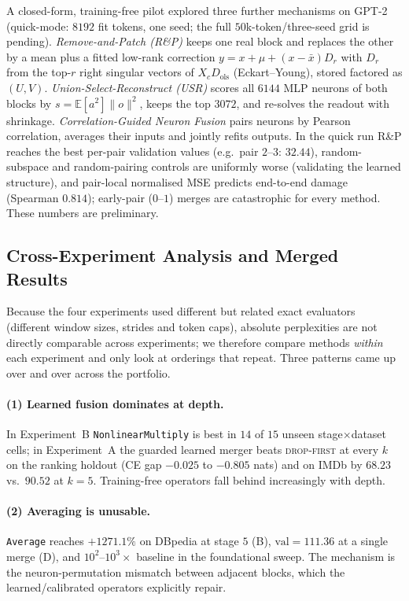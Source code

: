 \documentclass[10pt,a4paper]{article}
\newcommand{\dropfirst}{\textsc{drop-first}}
\newcommand{\averageop}{\texttt{Average}}
\newcommand{\nlop}{\texttt{NonlinearMultiply}}
\begin{document}
A closed-form, training-free pilot explored three further mechanisms on GPT-2
(quick-mode: $8192$ fit tokens, one seed; the full $50$k-token/three-seed grid is
pending). \emph{Remove-and-Patch (R\&P)} keeps one real block and replaces the
other by a mean plus a fitted low-rank correction $y=x+\mu+(x-\bar x)D_r$ with
$D_r$ from the top-$r$ right singular vectors of $X_cD_\text{ols}$
(Eckart--Young), stored factored as $(U,V)$. \emph{Union-Select-Reconstruct
(USR)} scores all $6144$ MLP neurons of both blocks by
$s=\mathbb{E}[a^2]\lVert o\rVert^2$, keeps the top $3072$, and re-solves the
readout with shrinkage. \emph{Correlation-Guided Neuron Fusion} pairs neurons by
Pearson correlation, averages their inputs and jointly refits outputs. In the
quick run R\&P reaches the best per-pair validation values (e.g.\ pair
$2$--$3$: $32.44$), random-subspace and random-pairing controls are uniformly
worse (validating the learned structure), and pair-local normalised MSE predicts
end-to-end damage (Spearman $0.814$); early-pair ($0$--$1$) merges are
catastrophic for every method. These numbers are preliminary.

\subsection{Cross-Experiment Analysis and Merged Results}
\label{sec:merged}

Because the four experiments used different but related exact evaluators
(different window sizes, strides and token caps), absolute perplexities are not
directly comparable across experiments; we therefore compare methods
\emph{within} each experiment and only look at orderings that repeat. Three
patterns came up over and over across the portfolio.

\paragraph{(1) Learned fusion dominates at depth.} In Experiment~B \nlop{} is
best in $14$ of $15$ unseen stage$\times$dataset cells; in Experiment~A the
guarded learned merger beats \dropfirst{} at every $k$ on the ranking holdout
(CE gap $-0.025$ to $-0.805$ nats) and on IMDb by $68.23$ vs.\ $90.52$ at
$k{=}5$. Training-free operators fall behind increasingly with depth.

\paragraph{(2) Averaging is unusable.} \averageop{} reaches $+1271.1\%$ on
DBpedia at stage $5$ (B), $\mathrm{val}=111.36$ at a single merge (D), and
$10^2$--$10^3\times$ baseline in the foundational sweep. The mechanism is the
neuron-permutation mismatch between adjacent blocks, which the learned/calibrated
operators explicitly repair.
\end{document}
